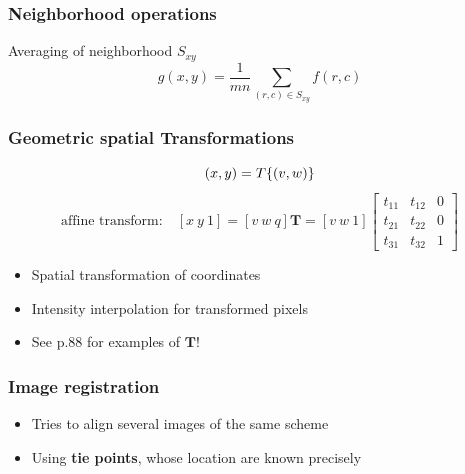 \subsubsection{Neighborhood operations }
Averaging of neighborhood $S_{xy}$
\begin{equation}
g(x,y) = \frac{1}{mn} \sum_{(r,c)\in S_{xy}}f(r,c)
\end{equation}

\subsubsection{Geometric spatial Transformations }
\begin{minipage}{0.55\textwidth}
  \[
  (x,y) = T\{(v,w)\} \notag \\
  \]
  \[
  \text{affine transform:} \quad \left[ x~y~1 \right] = [ v~w~q ] \mathbf{T} = [ v~w~1 ] 
  \left[ \begin{array}{ccc}
  t_{11} & t_{12} & 0 \\
  t_{21} & t_{22} & 0 \\
  t_{31} & t_{32} & 1 \end{array} \right]
  \]
\end{minipage}
\begin{minipage}{0.45\textwidth}
  \begin{itemize}
\item Spatial transformation of coordinates
\item Intensity interpolation for transformed pixels
\item See p.88 for examples of $\mathbf{T}$!
\end{itemize}
\end{minipage}

\subsubsection{Image registration }
\begin{itemize}
  \item Tries to align several images of the same scheme
  \item Using \textbf{tie points}, whose location are known precisely
\end{itemize}
